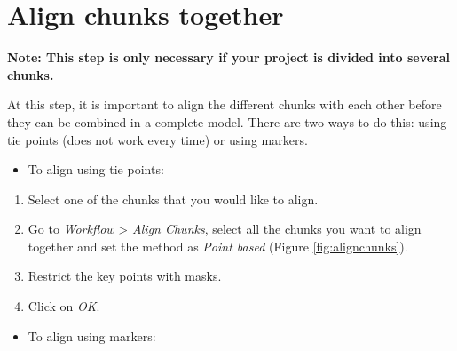 \documentclass[
]{book}
\providecommand{\tightlist}{%
  \setlength{\itemsep}{0pt}\setlength{\parskip}{0pt}}
\begin{document}
\hypertarget{align-chunks-together}{%
\section{Align chunks together}\label{align-chunks-together}}

{\textbf{Note: This step is only necessary if your project is divided into several chunks.}}

At this step, it is important to align the different chunks with each
other before they can be combined in a complete model. There are two
ways to do this: using tie points (does not work every time) or using markers.

\begin{itemize}
\tightlist
\item
  To align using tie points:
\end{itemize}

\begin{enumerate}
\def\labelenumi{\arabic{enumi}.}
\item
  Select one of the chunks that you would like to align.
\item
  Go to \emph{Workflow} \textgreater{} \emph{Align Chunks}, select all the chunks you want to
  align together and set the method as \emph{Point based} (Figure \ref{fig:alignchunks}).
\item
  Restrict the key points with masks.
\item
  Click on \emph{OK}.
\end{enumerate}

\begin{itemize}
\tightlist
\item
  To align using markers:
\end{itemize}
\end{document}
